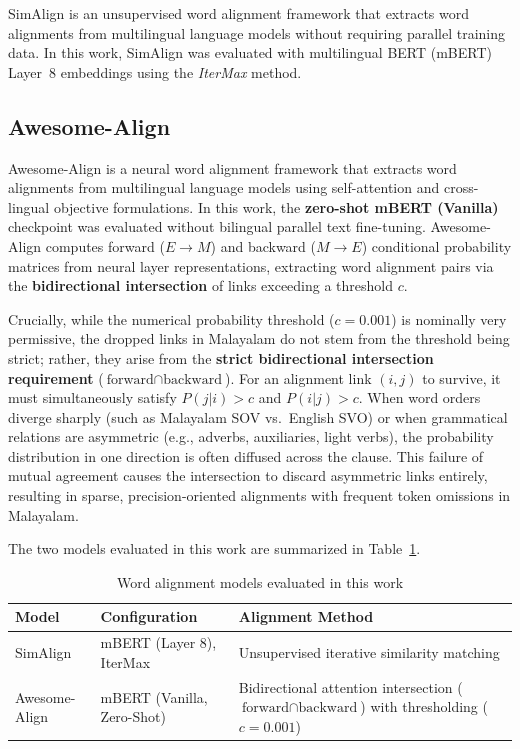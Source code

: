 SimAlign \citep{sabet2020simalign} is an unsupervised word alignment framework that extracts word alignments from multilingual language models without requiring parallel training data. In this work, SimAlign was evaluated with multilingual BERT (mBERT) Layer~8 embeddings using the \textit{IterMax} method.

\subsection{Awesome-Align}

Awesome-Align \citep{dou2021word} is a neural word alignment framework that extracts word alignments from multilingual language models using self-attention and cross-lingual objective formulations. In this work, the \textbf{zero-shot mBERT (Vanilla)} checkpoint was evaluated without bilingual parallel text fine-tuning. Awesome-Align computes forward ($E \to M$) and backward ($M \to E$) conditional probability matrices from neural layer representations, extracting word alignment pairs via the \textbf{bidirectional intersection} of links exceeding a threshold $c$. 

Crucially, while the numerical probability threshold ($c = 0.001$) is nominally very permissive, the dropped links in Malayalam do not stem from the threshold being strict; rather, they arise from the \textbf{strict bidirectional intersection requirement} ($\text{forward} \cap \text{backward}$). For an alignment link $(i, j)$ to survive, it must simultaneously satisfy $P(j|i) > c$ and $P(i|j) > c$. When word orders diverge sharply (such as Malayalam SOV vs.\ English SVO) or when grammatical relations are asymmetric (e.g., adverbs, auxiliaries, light verbs), the probability distribution in one direction is often diffused across the clause. This failure of mutual agreement causes the intersection to discard asymmetric links entirely, resulting in sparse, precision-oriented alignments with frequent token omissions in Malayalam.

The two models evaluated in this work are summarized in Table~\ref{tab:alignment_models}.
\begin{table}[h]
\centering
\caption{Word alignment models evaluated in this work}
\label{tab:alignment_models}
\begin{tabular}{>{\raggedright\arraybackslash}p{2.8cm} >{\raggedright\arraybackslash}p{4.2cm} >{\raggedright\arraybackslash}p{8.2cm}}
\toprule
\textbf{Model} & \textbf{Configuration} & \textbf{Alignment Method} \\
\midrule
SimAlign & mBERT (Layer 8), IterMax & Unsupervised iterative similarity matching \\
\addlinespace[3pt]
Awesome-Align & mBERT (Vanilla, Zero-Shot) & Bidirectional attention intersection ($\text{forward} \cap \text{backward}$) with thresholding ($c = 0.001$) \\
\bottomrule
\end{tabular}
\end{table}

